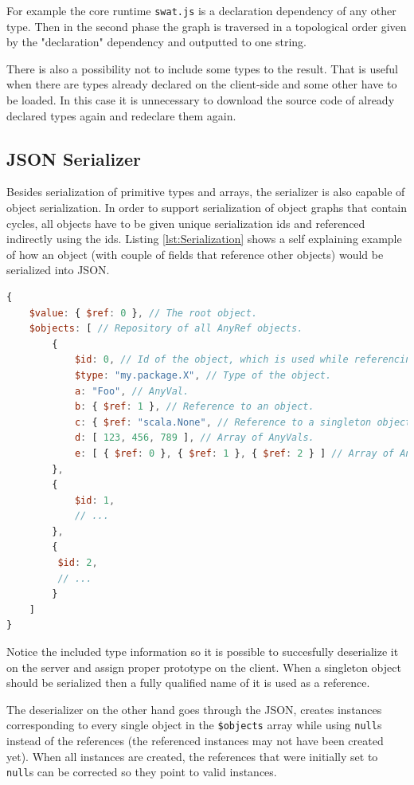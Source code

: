 \documentclass[12pt,a4paper]{report}
\begin{document}
For example the core runtime \texttt{swat.js} is a declaration dependency of any other type. Then in the second phase the graph is traversed in a topological order given by the "declaration" dependency and outputted to one string. 

There is also a possibility not to include some types to the result. That is useful when there are types already declared on the client-side and some other have to be loaded. In this case it is unnecessary to download the source code of already declared types again and redeclare them again.

\subsection{JSON Serializer}

Besides serialization of primitive types and arrays, the serializer is also capable of object serialization. In order to support serialization of object graphs that contain cycles, all objects have to be given unique serialization ids and referenced indirectly using the ids. Listing \ref{lst:Serialization} shows a self explaining example of how an object (with couple of fields that reference other objects) would be serialized into JSON. 

\begin{minipage}{\linewidth}
\begin{lstlisting}[language=JavaScript,caption={A serialized object that references other objects.},label={lst:Serialization},basicstyle=\scriptsize\ttfamily]
{
	$value: { $ref: 0 }, // The root object.
	$objects: [ // Repository of all AnyRef objects.
		{
			$id: 0, // Id of the object, which is used while referencing it.
			$type: "my.package.X", // Type of the object.
			a: "Foo", // AnyVal.
			b: { $ref: 1 }, // Reference to an object.
			c: { $ref: "scala.None", // Reference to a singleton object.
			d: [ 123, 456, 789 ], // Array of AnyVals.
			e: [ { $ref: 0 }, { $ref: 1 }, { $ref: 2 } ] // Array of AnyRefs.
		},
		{
			$id: 1,
			// ...
		},
		{
		 $id: 2,
		 // ...
		}
	]
}
\end{lstlisting}
\end{minipage}

Notice the included type information so it is possible to succesfully deserialize it on the server and assign proper prototype on the client. When a singleton object should be serialized then a fully qualified name of it is used as a reference.

The deserializer on the other hand goes through the JSON, creates instances corresponding to every single object in the \texttt{\$objects} array while using \texttt{null}s instead of the references (the referenced instances may not have been created yet). When all instances are created, the references that were initially set to \texttt{null}s can be corrected so they point to valid instances.
\end{document}
